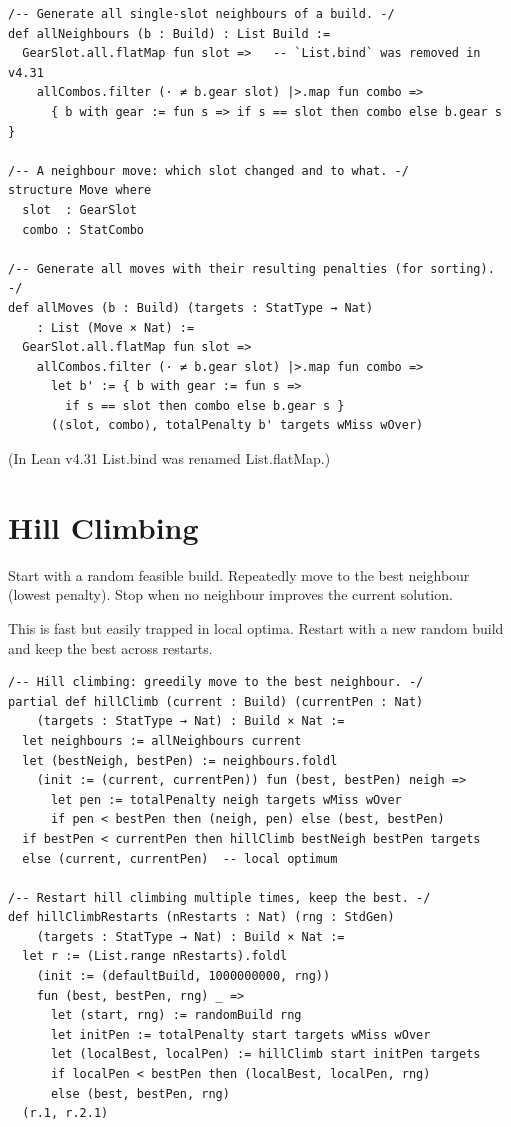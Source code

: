 \documentclass[11pt, a4paper, oneside]{book}
\newcommand{\li}[1]{{\ttfamily\small\color{deepblue}#1}}
\begin{document}
\begin{leanbox}[title={Lean 4 --- Neighbourhood Enumeration}]
\begin{verbatim}
/-- Generate all single-slot neighbours of a build. -/
def allNeighbours (b : Build) : List Build :=
  GearSlot.all.flatMap fun slot =>   -- `List.bind` was removed in v4.31
    allCombos.filter (· ≠ b.gear slot) |>.map fun combo =>
      { b with gear := fun s => if s == slot then combo else b.gear s }

/-- A neighbour move: which slot changed and to what. -/
structure Move where
  slot  : GearSlot
  combo : StatCombo

/-- Generate all moves with their resulting penalties (for sorting). -/
def allMoves (b : Build) (targets : StatType → Nat)
    : List (Move × Nat) :=
  GearSlot.all.flatMap fun slot =>
    allCombos.filter (· ≠ b.gear slot) |>.map fun combo =>
      let b' := { b with gear := fun s =>
        if s == slot then combo else b.gear s }
      (⟨slot, combo⟩, totalPenalty b' targets wMiss wOver)
\end{verbatim}
\end{leanbox}

(In Lean v4.31 \li{List.bind} was renamed \li{List.flatMap}.)

\section{Hill Climbing}

Start with a random feasible build.  Repeatedly move to the best neighbour
(lowest penalty).  Stop when no neighbour improves the current solution.

This is fast but easily trapped in local optima.  Restart with a new random
build and keep the best across restarts.

\begin{leanbox}[title={Lean 4 --- Hill Climbing with Restarts}]
\begin{verbatim}
/-- Hill climbing: greedily move to the best neighbour. -/
partial def hillClimb (current : Build) (currentPen : Nat)
    (targets : StatType → Nat) : Build × Nat :=
  let neighbours := allNeighbours current
  let (bestNeigh, bestPen) := neighbours.foldl
    (init := (current, currentPen)) fun (best, bestPen) neigh =>
      let pen := totalPenalty neigh targets wMiss wOver
      if pen < bestPen then (neigh, pen) else (best, bestPen)
  if bestPen < currentPen then hillClimb bestNeigh bestPen targets
  else (current, currentPen)  -- local optimum

/-- Restart hill climbing multiple times, keep the best. -/
def hillClimbRestarts (nRestarts : Nat) (rng : StdGen)
    (targets : StatType → Nat) : Build × Nat :=
  let r := (List.range nRestarts).foldl
    (init := (defaultBuild, 1000000000, rng))
    fun (best, bestPen, rng) _ =>
      let (start, rng) := randomBuild rng
      let initPen := totalPenalty start targets wMiss wOver
      let (localBest, localPen) := hillClimb start initPen targets
      if localPen < bestPen then (localBest, localPen, rng)
      else (best, bestPen, rng)
  (r.1, r.2.1)
\end{verbatim}
\end{leanbox}
\end{document}
